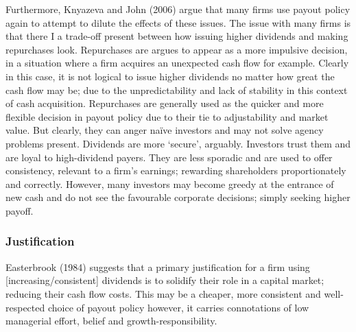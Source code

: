 \documentclass[11pt, english]{article}
\begin{document}
	Furthermore, Knyazeva and John (2006) argue that many firms use payout policy again to attempt to dilute the effects of these issues. The issue with many firms is that there I a trade-off present between how issuing higher dividends and making repurchases look. Repurchases are argues to appear as a more impulsive decision, in a situation where a firm acquires an unexpected cash flow for example. Clearly in this case, it is not logical to issue higher dividends no matter how great the cash flow may be; due to the unpredictability and lack of stability in this context of cash acquisition. Repurchases are generally used as the quicker and more flexible decision in payout policy due to their tie to adjustability and market value. But clearly, they can anger naïve investors and may not solve agency problems present. Dividends are more ‘secure’, arguably. Investors trust them and are loyal to high-dividend payers. They are less sporadic and are used to offer consistency, relevant to a firm’s earnings; rewarding shareholders proportionately and correctly. However, many investors may become greedy at the entrance of new cash and do not see the favourable corporate decisions; simply seeking higher payoff.

		\subsubsection*{Justification}

	Easterbrook (1984) suggests that a primary justification for a firm using [increasing/consistent] dividends is to solidify their role in a capital market; reducing their cash flow costs. This may be a cheaper, more consistent and well- respected choice of payout policy however, it carries connotations of low managerial effort, belief and growth-responsibility.\\
\end{document}
